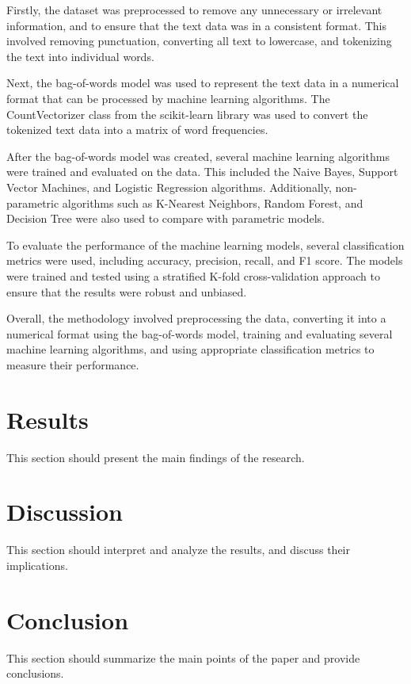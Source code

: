 \documentclass[12pt]{article}
\begin{document}
Firstly, the dataset was preprocessed to remove any unnecessary or irrelevant information, and to ensure that the text data was in a consistent format. This involved removing punctuation, converting all text to lowercase, and tokenizing the text into individual words.

Next, the bag-of-words model was used to represent the text data in a numerical format that can be processed by machine learning algorithms. The CountVectorizer class from the scikit-learn library was used to convert the tokenized text data into a matrix of word frequencies.

After the bag-of-words model was created, several machine learning algorithms were trained and evaluated on the data. This included the Naive Bayes, Support Vector Machines, and Logistic Regression algorithms. Additionally, non-parametric algorithms such as K-Nearest Neighbors, Random Forest, and Decision Tree were also used to compare with parametric models.

To evaluate the performance of the machine learning models, several classification metrics were used, including accuracy, precision, recall, and F1 score. The models were trained and tested using a stratified K-fold cross-validation approach to ensure that the results were robust and unbiased.

Overall, the methodology involved preprocessing the data, converting it into a numerical format using the bag-of-words model, training and evaluating several machine learning algorithms, and using appropriate classification metrics to measure their performance.

\section{Results}
This section should present the main findings of the research.

\section{Discussion}
This section should interpret and analyze the results, and discuss their implications.

\section{Conclusion}
This section should summarize the main points of the paper and provide conclusions.



\end{document}
